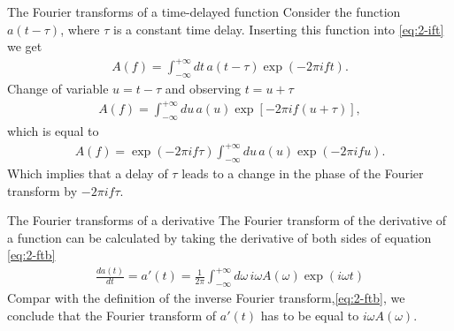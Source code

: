 \documentclass[xcolor=dvipsnames,notes]{beamer}
\begin{document}
\begin{frame}{The Fourier transforms of a time-delayed function}
%
Consider the function $a(t-\tau)$, where $\tau$ is a constant time delay. Inserting this
function into \eqref{eq:2-ift} we get
%
\begin{eqnarray}
A(f) = \int^{+\infty}_{-\infty} dt\, a(t-\tau) \exp(-2\pi i f t). 
\end{eqnarray}
%
Change of variable $u=t-\tau$ and observing $t=u+\tau$
%
\begin{eqnarray}
A(f) = \int^{+\infty}_{-\infty} du\, a(u) \exp[-2\pi i f (u+\tau)], 
\end{eqnarray}
%
which is equal to
%
\begin{eqnarray}
A(f) = \exp(-2\pi i f \tau) \int^{+\infty}_{-\infty} du\, a(u) \exp(-2\pi i f u). 
\end{eqnarray}
%
Which implies that a delay of $\tau$ leads to a change in the phase of the Fourier transform
by $-2\pi i f \tau$.
\end{frame}
\begin{frame}{The Fourier transforms of a derivative}
The Fourier transform of the derivative of a function can be calculated by taking the derivative
of both sides of equation \eqref{eq:2-ftb} 
\begin{eqnarray}
 \frac{d a(t)}{dt} = a'(t)=\frac{1}{2\pi}\int^{+\infty}_{-\infty} d\omega\, i\omega A(\omega) \exp(i\omega t)
\end{eqnarray}
Compar with the definition of the inverse Fourier transform,\eqref{eq:2-ftb}, we
conclude that the Fourier transform of $a'(t)$ has to be equal to $i\omega A(\omega)$. 
\end{frame}
\end{document}
